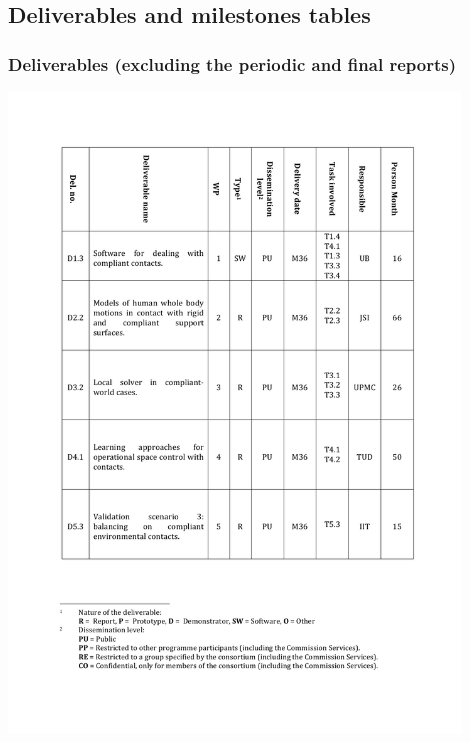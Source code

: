 \documentclass[12pt,a4paper,twoside]{article}
\begin{document}
\clearpage
\subsection{Deliverables and milestones tables}
\subsubsection{Deliverables (excluding the periodic and final reports)}
{\centering \includegraphics[width=0.9\textwidth]{./images/deliverables.pdf}}
\end{document}
